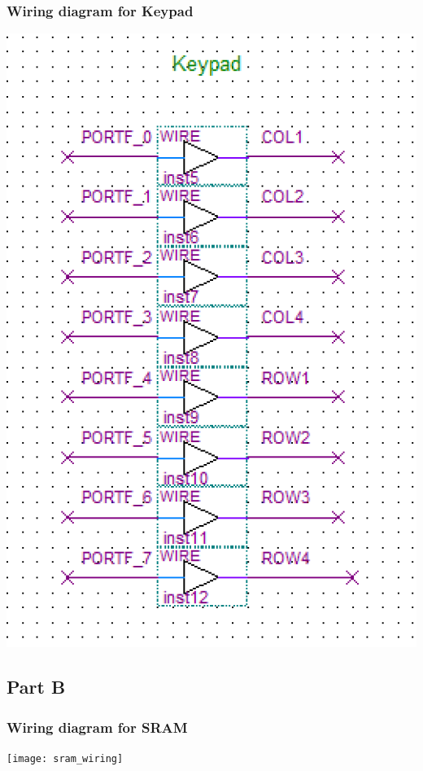 \documentclass[letterpaper, 12pt]{article}
\begin{document}
\subsubsection*{Wiring diagram for Keypad}
\begin{center}
  \includegraphics[scale=0.75]{keypad_schematic}
\end{center}
\subsection*{Part B}
\subsubsection*{Wiring diagram for SRAM}
\begin{center}
  \texttt{[image: sram\_wiring]}
\end{center}
\pagebreak
\end{document}
